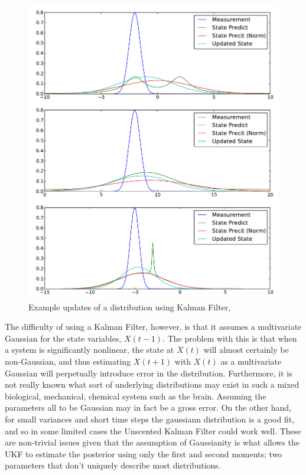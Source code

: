 \begin{figure}
\includegraphics[width=16cm]{images/kalman}
\caption{Example updates of a distribution using Kalman Filter, \cite{Thrun2005}}
\label{fig:EKFWorking}
\end{figure}

The difficulty
of using a Kalman Filter, however, is that it assumes a multivariate 
Gaussian for the state variables, $X(t-1)$. The problem with this is that 
when a system is significantly nonlinear, the state at 
$X(t)$ will almost certainly be non-Gaussian, and thus estimating
$X(t+1)$ with $X(t)$ as a multivariate Gaussian will perpetually introduce
error in the distribution. Furthermore, it is not really known what 
sort of underlying distributions may exist in such a mixed biological,
mechanical, chemical system such as the brain. Assuming the parameters
all to be Gaussian may in fact be a gross error. On the other hand, for
small variances and short time steps the gaussiann distribution is a good 
fit, and so in some limited cases the Unscented Kalman Filter could work
well. These are 
non-trivial issues given that the assumption of Gaussianity is what allows
the UKF to estimate the posterior using only the first and second moments;
two parameters that don't uniquely describe most distributions.

